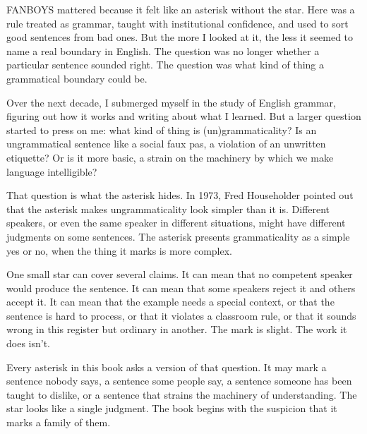 FANBOYS mattered because it felt like an asterisk without the star. Here
was a rule treated as grammar, taught with institutional confidence, and
used to sort good sentences from bad ones. But the more I looked at it,
the less it seemed to name a real boundary in English. The question was
no longer whether a particular sentence sounded right. The question was
what kind of thing a grammatical boundary could be.

Over the next decade, I submerged myself in the study of English grammar,
figuring out how it works and writing about what I learned. But a larger
question started to press on me: what kind of thing is
(un)grammaticality? Is an ungrammatical sentence like a social faux pas,
a violation of an unwritten etiquette? Or is it more basic, a strain on
the machinery by which we make language intelligible?

That question is what the asterisk hides. In 1973, Fred Householder
\citep{Householder1973} pointed out that the asterisk makes
ungrammaticality look simpler than it is. Different speakers, or even
the same speaker in different situations, might have different judgments
on some sentences. The asterisk presents grammaticality as a simple yes
or no, when the thing it marks is more complex.

One small star can cover several claims. It can mean that no competent
speaker would produce the sentence. It can mean that some speakers reject
it and others accept it. It can mean that the example needs a special
context, or that the sentence is hard to process, or that it violates a
classroom rule, or that it sounds wrong in this register but ordinary in
another. The mark is slight. The work it does isn't.

Every asterisk in this book asks a version of that question. It may mark
a sentence nobody says, a sentence some people say, a sentence someone
has been taught to dislike, or a sentence that strains the machinery of
understanding. The star looks like a single judgment. The book begins
with the suspicion that it marks a family of them.
